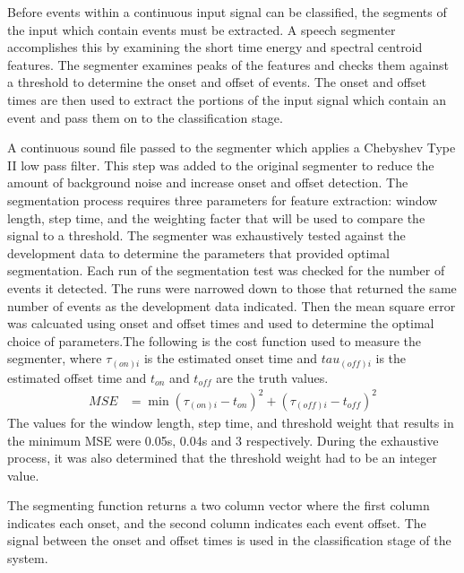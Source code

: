 Before events within a continuous input signal can be classified, the segments of the input which contain events must be extracted. A speech segmenter \cite{silenceRemove} accomplishes this by examining the short time energy and spectral centroid features.  The segmenter examines peaks of the features and checks them against a threshold to determine the onset and offset of events. The onset and offset times are then used to extract the portions of the input signal which contain an event and pass them on to the classification stage. 

A continuous sound file passed to the segmenter which  applies a Chebyshev Type II low pass filter. This step was added to the original segmenter to reduce the amount of background noise and increase onset and offset detection. The segmentation process requires three parameters for feature extraction: window length, step time, and the weighting facter that will be used to compare the signal to a threshold. The segmenter was exhaustively tested against the development data to determine the parameters that provided optimal segmentation. Each run of the segmentation test was checked for the number of events it detected. The runs were narrowed down to those that returned the same number of events as the development data indicated. Then the mean square error was calcuated using onset and offset times and used to determine the optimal choice of parameters.The following is the cost function used to measure the segmenter, where $\tau_{(on)i}$ is the estimated onset time and $tau_{(off)i}$ is the estimated offset time and $t_{on}$ and $t_{off}$ are the truth values.
\begin{align}
{MSE} &=\min{ (\tau_{(on)i}-t_{on} )^2 + (\tau_{(off)i}-t_{off})^2  }
\end{align}
The values for the window length, step time, and threshold weight that results in the minimum MSE were 0.05s, 0.04s and 3 respectively. During the exhaustive process, it was also determined that the threshold weight had to be an integer value. 

The segmenting function returns a two column vector where the first column indicates each onset, and the second column indicates each event offset. The signal between the onset and offset times is used in the classification stage of the system. 
